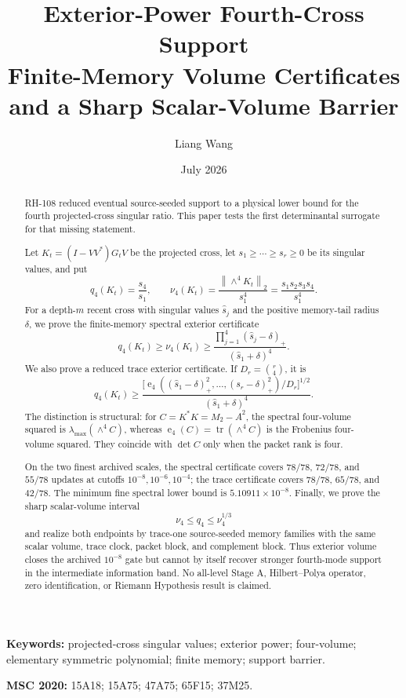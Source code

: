 \documentclass[11pt]{article}
\title{Exterior-Power Fourth-Cross Support\\
\large Finite-Memory Volume Certificates and a Sharp Scalar-Volume Barrier}
\author{Liang Wang}
\date{July 2026}
\theoremstyle{definition}
\theoremstyle{remark}
\newcommand{\norm}[1]{\left\lVert#1\right\rVert}
\newcommand{\tr}{\operatorname{tr}}
\newcommand{\e}{\operatorname{e}}
\begin{document}
\maketitle

\begin{abstract}
RH-108 reduced eventual source-seeded support to a physical lower bound for
the fourth projected-cross singular ratio.  This paper tests the first
determinantal surrogate for that missing statement.

Let $K_t=(I-VV^*)G_tV$ be the projected cross, let
$s_1\ge\cdots\ge s_r\ge0$ be its singular values, and put
\[
 q_4(K_t)=\frac{s_4}{s_1},
 \qquad
 \nu_4(K_t)=\frac{\norm{\wedge^4K_t}_2}{s_1^4}
 =\frac{s_1s_2s_3s_4}{s_1^4}.
\]
For a depth-$m$ recent cross with singular values $\widehat s_j$ and the
positive memory-tail radius $\delta$, we prove the finite-memory spectral
exterior certificate
\[
 q_4(K_t)\ge\nu_4(K_t)\ge
 \frac{\prod_{j=1}^4(\widehat s_j-\delta)_+}
      {(\widehat s_1+\delta)^4}.
\]
We also prove a reduced trace exterior certificate.  If
$D_r=\binom r4$, it is
\[
 q_4(K_t)\ge
 \frac{\bigl[\e_4((\widehat s_1-\delta)_+^2,\ldots,
 (\widehat s_r-\delta)_+^2)/D_r\bigr]^{1/2}}
      {(\widehat s_1+\delta)^4}.
\]
The distinction is structural: for
$C=K^*K=M_2-A^2$, the spectral four-volume squared is
$\lambda_{\max}(\wedge^4C)$, whereas
$\e_4(C)=\tr(\wedge^4C)$ is the Frobenius four-volume squared.  They coincide
with $\det C$ only when the packet rank is four.

On the two finest archived scales, the spectral certificate covers
$78/78$, $72/78$, and $55/78$ updates at cutoffs
$10^{-8},10^{-6},10^{-4}$; the trace certificate covers
$78/78$, $65/78$, and $42/78$.  The minimum fine spectral lower bound is
$5.10911\times10^{-8}$.  Finally, we prove the sharp scalar-volume interval
\[
 \nu_4\le q_4\le\nu_4^{1/3}
\]
and realize both endpoints by trace-one source-seeded memory families with
the same scalar volume, trace clock, packet block, and complement block.
Thus exterior volume closes the archived $10^{-8}$ gate but cannot by itself
recover stronger fourth-mode support in the intermediate information band.
No all-level Stage A, Hilbert--Polya operator, zero identification, or
Riemann Hypothesis result is claimed.
\end{abstract}

\noindent\textbf{Keywords:} projected-cross singular values; exterior power;
four-volume; elementary symmetric polynomial; finite memory; support barrier.

\medskip
\noindent\textbf{MSC 2020:} 15A18; 15A75; 47A75; 65F15; 37M25.
\end{document}
